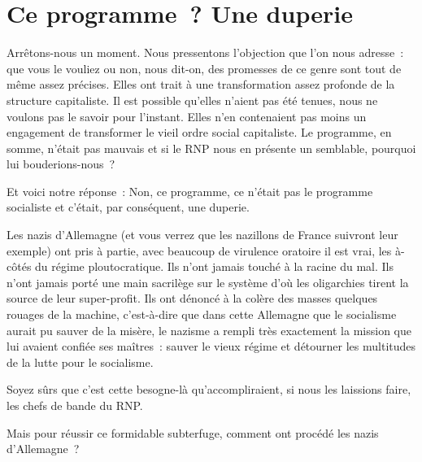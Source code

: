 \documentclass[french,twoside]{book} %
\begin{document}
\section[{Ce programme ? Une duperie}]{Ce programme ? Une duperie}
\noindent Arrêtons-nous un moment. Nous pressentons l’objection que l’on nous adresse : que vous le vouliez ou non, nous dit-on, des promesses de ce genre sont tout de même assez précises. Elles ont trait à une transformation assez profonde de la structure capitaliste. Il est possible qu’elles n’aient pas été tenues, nous ne voulons pas le savoir pour l’instant. Elles n’en contenaient pas moins un engagement de transformer le vieil ordre social capitaliste. Le programme, en somme, n’était pas mauvais et si le RNP nous en présente un semblable, pourquoi lui bouderions-nous ?\par
Et voici notre réponse : Non, ce programme, ce n’était pas le programme socialiste et c’était, par conséquent, une duperie.\par
Les nazis d’Allemagne (et vous verrez que les nazillons de France suivront leur exemple) ont pris à partie, avec beaucoup de virulence oratoire il est vrai, les à-côtés du régime ploutocratique. Ils n’ont jamais touché à la racine du mal. Ils n’ont jamais porté une main sacrilège sur le système d’où les oligarchies tirent la source de leur super-profit. Ils ont dénoncé à la colère des masses quelques rouages de la machine, c’est-à-dire que dans cette Allemagne que le socialisme aurait pu sauver de la misère, le nazisme a rempli très exactement la mission que lui avaient confiée ses maîtres : sauver le vieux régime et détourner les multitudes de la lutte pour le socialisme.\par
Soyez sûrs que c’est cette besogne-là qu’accompliraient, si nous les laissions faire, les chefs de bande du RNP.\par
Mais pour réussir ce formidable subterfuge, comment ont procédé les nazis d’Allemagne ?
\end{document}
